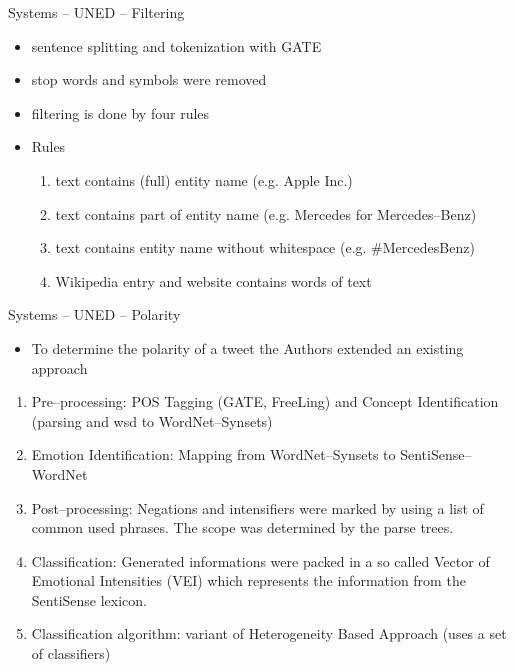 \documentclass[12pt,a4paper]{beamer}
\begin{document}
\begin{frame}{Systems -- UNED -- Filtering}

\begin{itemize}
\item sentence splitting and tokenization with GATE
\item stop words and symbols were removed
\item filtering is done by four rules
\end{itemize}
\begin{itemize}
\item Rules
\begin{enumerate}
\item text contains (full) entity name (e.g. Apple Inc.)
\item text contains part of entity name (e.g. Mercedes for Mercedes--Benz)
\item text contains entity name without whitespace (e.g. \#MercedesBenz)
\item Wikipedia entry and website contains words of text
\end{enumerate}
\end{itemize}
\end{frame}








\begin{frame}{Systems -- UNED -- Polarity}
\begin{itemize}
\item To determine the polarity of a tweet the Authors extended an existing approach
\end{itemize}
\begin{enumerate}
\item Pre--processing: POS Tagging (GATE, FreeLing) and Concept Identification (parsing and wsd to WordNet--Synsets)
\item Emotion Identification: Mapping from WordNet--Synsets to SentiSense--WordNet
\item Post--processing: Negations and intensifiers were marked by using a list of common used phrases. The scope was determined by the parse trees.
\item Classification: Generated informations were packed in a so called Vector of Emotional Intensities (VEI) which represents the information from the SentiSense lexicon.
\item Classification algorithm: variant of Heterogeneity Based Approach (uses a set of classifiers)
\end{enumerate}

\end{frame}
\end{document}
